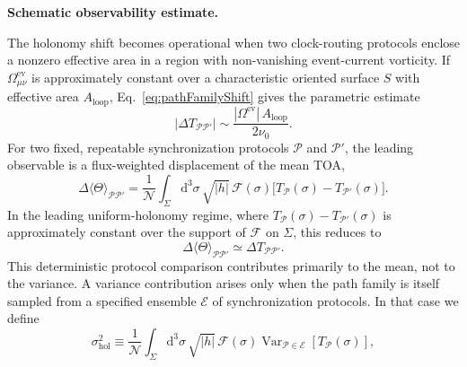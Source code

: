 \documentclass[11pt, a4paper]{article}
\theoremstyle{definition}
\theoremstyle{plain}
\theoremstyle{remark}
\numberwithin{equation}{section}
\newcommand{\dd}{\mathrm{d}}
\begin{document}
        \medskip\noindent\textbf{Schematic observability estimate.}\par
            The holonomy shift becomes operational when two clock-routing protocols enclose a nonzero effective area in a region with non-vanishing event-current vorticity. If $\Omega^{\mathrm{ev}}_{\mu\nu}$ is approximately constant over a characteristic oriented surface $S$ with effective area $A_{\mathrm{loop}}$, Eq.~\eqref{eq:pathFamilyShift} gives the parametric estimate
            \begin{equation}
                \left|\Delta T_{\mathcal{P}\mathcal{P}'}\right|
                \sim
                \frac{|\Omega^{\mathrm{ev}}|\,A_{\mathrm{loop}}}{2\nu_0}.
                \label{eq:holonomyEstimate}
            \end{equation}
            For two fixed, repeatable synchronization protocols $\mathcal{P}$ and $\mathcal{P}'$, the leading observable is a flux-weighted displacement of the mean TOA,
            \begin{equation}
                \Delta\langle\Theta\rangle_{\mathcal{P}\mathcal{P}'}
                =
                \frac{1}{\mathcal{N}}
                \int_{\Sigma}\dd^3\sigma\,\sqrt{|h|}\,
                \mathcal{F}(\sigma)
                \big[T_{\mathcal{P}}(\sigma)-T_{\mathcal{P}'}(\sigma)\big].
                \label{eq:holonomyMeanShiftGeneral}
            \end{equation}
            In the leading uniform-holonomy regime, where $T_{\mathcal{P}}(\sigma)-T_{\mathcal{P}'}(\sigma)$ is approximately constant over the support of $\mathcal{F}$ on $\Sigma$, this reduces to
            \begin{equation}
                \Delta\langle\Theta\rangle_{\mathcal{P}\mathcal{P}'}
                \simeq
                \Delta T_{\mathcal{P}\mathcal{P}'}.
                \label{eq:holonomyMeanShift}
            \end{equation}
            This deterministic protocol comparison contributes primarily to the mean, not to the variance.
            A variance contribution arises only when the path family is itself sampled from a specified ensemble $\mathcal{E}$ of synchronization protocols. In that case we define
            \begin{equation}
                \sigma_{\mathrm{hol}}^2
                \equiv
                \frac{1}{\mathcal{N}}
                \int_{\Sigma}\dd^3\sigma\,\sqrt{|h|}\,
                \mathcal{F}(\sigma)
                \operatorname{Var}_{\mathcal{P}\in\mathcal{E}}
                \!\left[T_{\mathcal{P}}(\sigma)\right],
                \label{eq:sigmaHolDefinition}
            \end{equation}
\end{document}
